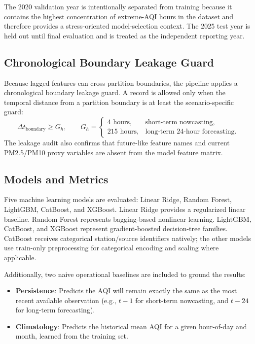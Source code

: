\documentclass[11pt,a4paper]{article}
\begin{document}
The 2020 validation year is intentionally separated from training because it contains the highest concentration of extreme-AQI hours in the dataset and therefore provides a stress-oriented model-selection context. The 2025 test year is held out until final evaluation and is treated as the independent reporting year.

\subsection{Chronological Boundary Leakage Guard}
Because lagged features can cross partition boundaries, the pipeline applies a chronological boundary leakage guard. A record is allowed only when the temporal distance from a partition boundary is at least the scenario-specific guard:
\begin{equation}
    \Delta t_{\mathrm{boundary}} \geq G_h,
    \qquad
    G_h =
    \begin{cases}
    4 \text{ hours}, & \text{short-term nowcasting},\\
    215 \text{ hours}, & \text{long-term 24-hour forecasting}.
    \end{cases}
    \label{eq:boundary-guard}
\end{equation}
The leakage audit also confirms that future-like feature names and current PM2.5/PM10 proxy variables are absent from the model feature matrix.

\subsection{Models and Metrics}
Five machine learning models are evaluated: Linear Ridge, Random Forest, LightGBM, CatBoost, and XGBoost. Linear Ridge provides a regularized linear baseline. Random Forest represents bagging-based nonlinear learning. LightGBM, CatBoost, and XGBoost represent gradient-boosted decision-tree families. CatBoost receives categorical station/source identifiers natively; the other models use train-only preprocessing for categorical encoding and scaling where applicable.

Additionally, two naive operational baselines are included to ground the results:
\begin{itemize}
    \item \textbf{Persistence}: Predicts the AQI will remain exactly the same as the most recent available observation (e.g., $t-1$ for short-term nowcasting, and $t-24$ for long-term forecasting).
    \item \textbf{Climatology}: Predicts the historical mean AQI for a given hour-of-day and month, learned from the training set.
\end{itemize}
\end{document}
